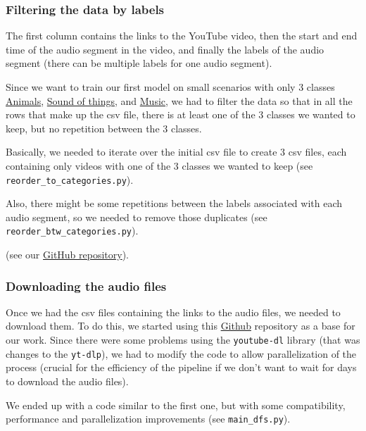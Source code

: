 \documentclass[11pt]{article}
\begin{document}
\subsubsection*{Filtering the data by labels}

The first column contains the links to the YouTube video, then the start and end time of the audio segment in the video, and finally the labels of the audio segment (there can be multiple labels for one audio segment).

Since we want to train our first model on small scenarios with only 3 classes \href{https://research.google.com/audioset/ontology/animal_1.html}{Animals}, \href{https://research.google.com/audioset/ontology/sounds_of_things_1.html}{Sound of things}, and \href{https://research.google.com/audioset/ontology/music_1.html}{Music}, we had to filter the data so that in all the rows that make up the csv file, there is at least one of the 3 classes we wanted to keep, but no repetition between the 3 classes.

Basically, we needed to iterate over the initial csv file to create 3 csv files, each containing only videos with one of the 3 classes we wanted to keep (see \texttt{reorder\_to\_categories.py}).

Also, there might be some repetitions between the labels associated with each audio segment, so we needed to remove those duplicates (see \texttt{reorder\_btw\_categories.py}).

(see our \href{https://github.com/LGPolytech/Project_S9}{GitHub repository}).

\subsubsection*{Downloading the audio files}

Once we had the csv files containing the links to the audio files, we needed to download them. To do this, we started using this \href{https://github.com/bakhtos/GoogleAudioSetScripts}{Github} repository as a base for our work. Since there were some problems using the \texttt{youtube-dl} library (that was changes to the \texttt{yt-dlp}), we had to modify the code to allow parallelization of the process (crucial for the efficiency of the pipeline if we don't want to wait for days to download the audio files).

We ended up with a code similar to the first one, but with some compatibility, performance and parallelization improvements (see \texttt{main\_dfs.py}).
\end{document}
